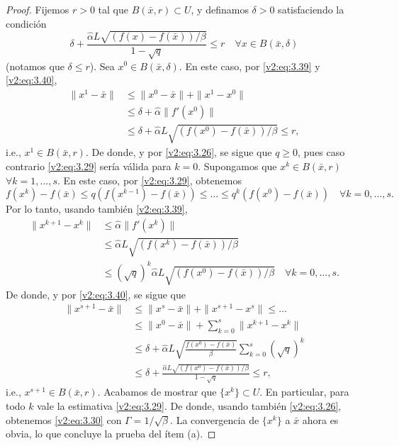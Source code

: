\begin{proof}
    Fijemos $r > 0$ tal que $B(\bar{x}, r) \subset U$, y definamos $\delta > 0$ satisfaciendo la condición
    \begin{equation}
        \delta + \frac{\hat{\alpha} L \sqrt{(f(x) - f(\bar{x}))/\beta}}{1 - \sqrt{q}} \le r \quad \forall x \in B(\bar{x}, \delta)
        \label{v2:eq:3.40}
    \end{equation}
    (notamos que $\delta \le r$). Sea $x^0 \in B(\bar{x}, \delta)$. En este caso, por \eqref{v2:eq:3.39} y \eqref{v2:eq:3.40},
    \begin{align*}
        \|x^1 - \bar{x}\| &\le \|x^0 - \bar{x}\| + \|x^1 - x^0\| \\
        &\le \delta + \hat{\alpha}\|f'(x^0)\| \\
        &\le \delta + \hat{\alpha} L \sqrt{(f(x^0) - f(\bar{x}))/\beta} \le r,
    \end{align*}
    i.e., $x^1 \in B(\bar{x}, r)$. De donde, y por \eqref{v2:eq:3.26}, se sigue que $q \ge 0$, pues caso contrario \eqref{v2:eq:3.29} sería válida para $k = 0$.
    Supongamos que $x^k \in B(\bar{x}, r)$ $\forall k = 1, \dots, s$. En este caso, por \eqref{v2:eq:3.29}, obtenemos
    \[
        f(x^k) - f(\bar{x}) \le q(f(x^{k-1}) - f(\bar{x})) \le \dots \le q^k(f(x^0) - f(\bar{x})) \quad \forall k = 0, \dots, s.
    \]
    Por lo tanto, usando también \eqref{v2:eq:3.39},
    \begin{align*}
        \|x^{k+1} - x^k\| &\le \hat{\alpha}\|f'(x^k)\| \\
        &\le \hat{\alpha} L \sqrt{(f(x^k) - f(\bar{x}))/\beta} \\
        &\le (\sqrt{q})^k \hat{\alpha} L \sqrt{(f(x^0) - f(\bar{x}))/\beta} \quad \forall k = 0, \dots, s.
    \end{align*}
    De donde, y por \eqref{v2:eq:3.40}, se sigue que
    \begin{align*}
        \|x^{s+1} - \bar{x}\| &\le \|x^s - \bar{x}\| + \|x^{s+1} - x^s\| \le \dots \\
        &\le \|x^0 - \bar{x}\| + \sum_{k=0}^s \|x^{k+1} - x^k\| \\
        &\le \delta + \hat{\alpha} L \sqrt{\frac{f(x^0) - f(\bar{x})}{\beta}} \sum_{k=0}^s (\sqrt{q})^k \\
        &\le \delta + \frac{\hat{\alpha} L \sqrt{(f(x^0) - f(\bar{x}))/\beta}}{1 - \sqrt{q}} \le r,
    \end{align*}
    i.e., $x^{s+1} \in B(\bar{x}, r)$.
    Acabamos de mostrar que $\{x^k\} \subset U$. En particular, para todo $k$ vale la estimativa \eqref{v2:eq:3.29}. De donde, usando también \eqref{v2:eq:3.26}, obtenemos \eqref{v2:eq:3.30} con $\Gamma = 1/\sqrt{\beta}$. La convergencia de $\{x^k\}$ a $\bar{x}$ ahora es obvia, lo que concluye la prueba del ítem (a).


\end{proof}
